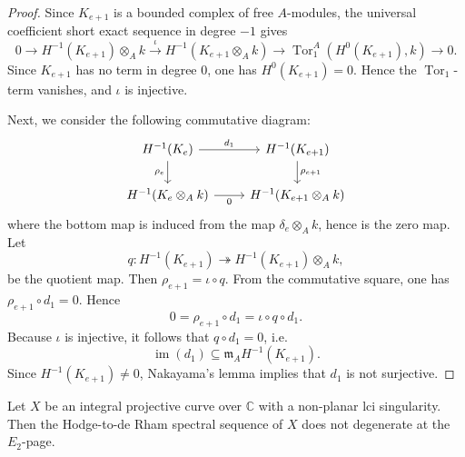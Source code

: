 \documentclass[12pt,reqno]{amsart}
\begin{document}
\begin{proof}
Since \(K_{e+1}\) is a bounded complex of free \(A\)-modules, the universal coefficient short exact sequence in degree \(-1\) gives
\[
0\longrightarrow H^{-1}(K_{e+1})\otimes_A k
\xrightarrow{\iota}
H^{-1}(K_{e+1}\otimes_A k)
\longrightarrow
\operatorname{Tor}_1^A(H^0(K_{e+1}),k)
\longrightarrow 0.
\]
Since \(K_{e+1}\) has no term in degree \(0\), one has \(H^0(K_{e+1})=0\). Hence the \(\operatorname{Tor}_1\)-term vanishes, and \(\iota\) is injective.

Next, we consider the following commutative diagram:
\[
\begin{tikzcd}
H^{-1}(K_e) \ar[r, "d_1"] \ar[d, "\rho_e"']
& H^{-1}(K_{e+1}) \ar[d, "\rho_{e+1}"] \\
H^{-1}(K_e\otimes_A k) \ar[r, "0"']
& H^{-1}(K_{e+1}\otimes_A k)
\end{tikzcd}
\]
where the bottom map is induced from the map \(\delta_e\otimes_A k\), hence is the zero map. Let
\[
q:H^{-1}(K_{e+1})\twoheadrightarrow H^{-1}(K_{e+1})\otimes_A k,
\]
be the quotient map. Then \(\rho_{e+1}=\iota\circ q\). From the commutative square, one has \(\rho_{e+1}\circ d_1=0\). Hence
\[
0=\rho_{e+1}\circ d_1=\iota\circ q\circ d_1.
\]
Because \(\iota\) is injective, it follows that \(q\circ d_1=0\), i.e.
\[
\operatorname{im}(d_1)\subseteq \mathfrak m_A H^{-1}(K_{e+1}).
\]
Since \(H^{-1}(K_{e+1})\neq 0\), Nakayama's lemma implies that \(d_1\) is not surjective.
\end{proof}

\begin{corollary}\label{cor:nonplanar-global-obstruction}
Let $X$ be an integral projective curve over $\mathbb{C}$ with a non-planar lci singularity. Then the Hodge-to-de Rham spectral sequence of $X$ does not degenerate at the \(E_2\)-page.
\end{corollary}
\end{document}
